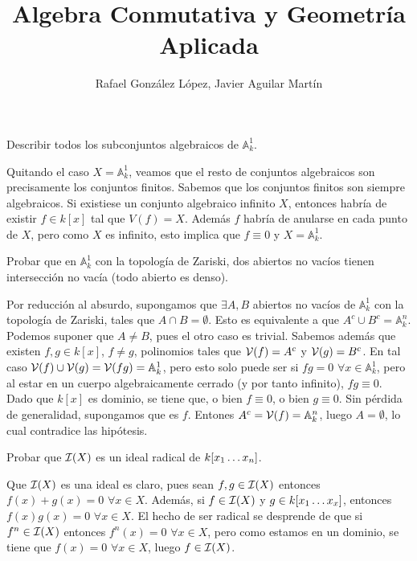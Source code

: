\documentclass[twoside]{article}
\begin{document}
\title{Algebra Conmutativa y Geometría Aplicada}
\author{Rafael González López, Javier Aguilar Martín}
\maketitle

\begin{ejercicio}{1}
Describir todos los subconjuntos algebraicos de $\mathbb{A}_k^1$.
\begin{solucion}
Quitando el caso $X=\mathbb{A}_k^1$, veamos que el resto de conjuntos algebraicos son precisamente los conjuntos finitos. Sabemos que los conjuntos finitos son siempre algebraicos. Si existiese un conjunto algebraico infinito $X$, entonces habría de existir $f \in k[x]$ tal que $V(f)=X$. Además $f$ habría de anularse en cada punto de $X$, pero como $X$ es infinito, esto implica que $f\equiv 0$ y $X=\mathbb{A}_k^1$.
\end{solucion}
\end{ejercicio}

\newpage 
\begin{ejercicio}{2}
Probar que en $\mathbb{A}^1_k$ con la topología de Zariski, dos abiertos no vacíos tienen intersección no vacía (todo abierto es denso).
\begin{solucion}
Por reducción al absurdo, supongamos que $\exists A,B$ abiertos no vacíos de $\mathbb{A}_k^1$ con la topología de Zariski, tales que $A\cap B =\emptyset$. Esto es equivalente a que $A^c \cup B^c = \mathbb{A}_k^n$. Podemos suponer que $A\neq B$, pues el otro caso es trivial. Sabemos además que existen $f,g\in k[x]$, $f\neq g$, polinomios tales que $\mathcal{V}(f) = A^c$ y $\mathcal{V}(g)=B^c$. En tal caso $\mathcal{V}(f)\cup \mathcal{V}(g)=\mathcal{V}(fg) = \mathbb{A}^1_k$, pero esto solo puede ser si $fg = 0$ $\forall x\in \mathbb{A}^1_k$, pero al estar en un cuerpo algebraicamente cerrado (y por tanto infinito), $fg\equiv 0$. Dado que $k[x]$ es dominio, se tiene que, o bien $f\equiv 0$, o bien $g \equiv 0$. Sin pérdida de generalidad, supongamos que es $f$. Entones $A^c = \mathcal{V}(f) = \mathbb{A}_k^n$, luego $A=\emptyset$, lo cual contradice las hipótesis.
\end{solucion}
\end{ejercicio}

\newpage 
\begin{ejercicio}{3}
Probar que $\mathcal{I}(X)$ es un ideal radical de $k[x_1\dotsc x_{n}]$.
\begin{solucion}
Que $\mathcal{I}(X)$ es una ideal es claro, pues sean $f,g \in \mathcal{I}(X)$ entonces $f(x)+g(x)=0$ $\forall x\in X$. Además, si $f\in \mathcal{I}(X)$ y $g \in k[x_1\dotsc x_{x}]$, entonces $f(x)g(x)=0$ $\forall x\in X$. El hecho de ser radical se desprende de que si $f^n\in \mathcal{I}(X)$ entonces $f^n(x) =0$ $\forall x \in X$, pero como estamos en un dominio, se tiene que $f(x)=0$ $\forall x\in X$, luego $f\in \mathcal{I}(X)$.
\end{solucion}
\end{ejercicio}	
\end{document}
